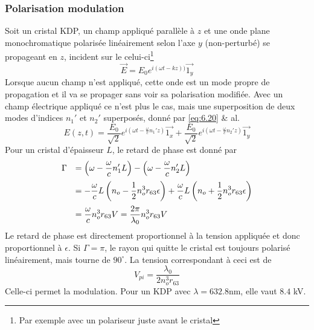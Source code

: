 \subsubsection{Polarisation modulation}
Soit un cristal KDP, un champ appliqué parallèle à $z$ et une onde plane monochromatique polarisée
linéairement selon l'axe $y$ (non-perturbé) se propageant en $z$, incident sur le celui-ci\footnote{Par
exemple avec un polariseur juste avant le cristal}
\begin{equation}
\vec E = E_0e^{i(\omega t-kz))}\vec{1_y}
\end{equation}
Lorsque aucun champ n'est appliqué, cette onde est un mode propre de propagation et il va se propager
sans voir sa polarisation modifiée. Avec un champ électrique appliqué ce n'est plus le cas, mais une 
superposition de deux modes d'indices $n_1'$ et $n_2'$ superposés, donné par \eqref{eq:6.20} \& al. 
\begin{equation}
E(z,t) = \dfrac{E_0}{\sqrt{2}}e^{i\left(\omega t-\frac{\omega}{c}n_1'z\right)}\vec{1_x}+
\dfrac{E_0}{\sqrt{2}}e^{i\left(\omega t-\frac{\omega}{c}n_2'z\right)}\vec{1_y}
\end{equation}
Pour un cristal d'épaisseur $L$, le retard de phase est donné par
\begin{equation}
\begin{array}{ll}
\Gamma &\DS= \left(\omega-\dfrac{\omega}{c}n_1'L\right)-\left(\omega-\dfrac{\omega}{c}n_2'L\right)\vspace{2mm}\\
&\DS=-\dfrac{\omega}{c}L\left(n_o-\dfrac{1}{2}n_o^3r_{63}\epsilon\right)+\dfrac{\omega}{c}L\left(n_o+\dfrac{1}{2}n_o^3r_{63}\epsilon\right)\vspace{2mm}\\
&=\DS\dfrac{\omega}{c}n_o^3r_{63}V = \dfrac{2\pi}{\lambda_0}n_o^3r_{63}V
\end{array}
\end{equation}
Le retard de phase est directement proportionnel à la tension appliquée et donc proportionnel à $\epsilon$. 
Si $\Gamma=\pi$, le rayon qui quitte le cristal est toujours polarisé linéairement, mais tourne de 
$90^\circ$. La tension correspondant à ceci est de
\begin{equation}
V_{pi} = \dfrac{\lambda_0}{2n_o^3r_{63}}
\end{equation}
Celle-ci permet la modulation. Pour un KDP avec $\lambda=632.8$nm, elle vaut $8.4$ kV.


